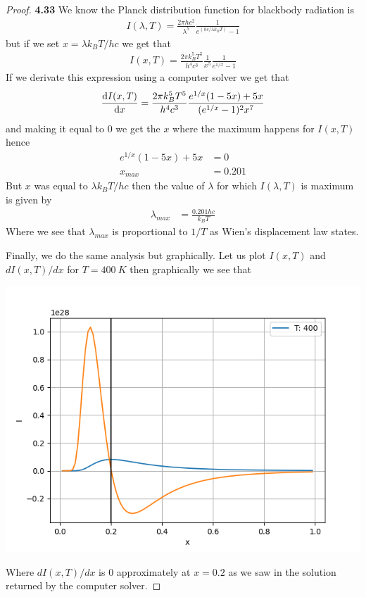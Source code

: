 \documentclass[11pt]{article}
\theoremstyle{definition}
\begin{document}
\begin{proof}{\textbf{4.33}}
    We know the Planck distribution function for blackbody radiation is
    \begin{align*}
        I(\lambda, T)
        = \frac{2\pi hc^2}{\lambda^5}\frac{1}{e^{(hc/\lambda k_B T)} -1}
    \end{align*}
    but if we set $x = \lambda k_B T / hc$ we get that
    \begin{align*}
        I(x, T)
        = \frac{2\pi k_B^5 T^5 }{h^4c^3}\frac{1}{x^5}\frac{1}{e^{1/x} -1}
    \end{align*}
    If we derivate this expression using a computer solver we get that
    \begin{align*}
        \derivative{I(x, T)}{x}
        = \frac{2\pi k_B^5 T^5 }{h^4c^3}
        \frac{e^{1/x}(1 - 5x) + 5x}{(e^{1/x}-1)^2x^7}
    \end{align*}
    and making it equal to 0 we get the $x$ where the maximum happens for
    $I(x,T)$ hence
    \begin{align*}
        e^{1/x}(1 - 5x) + 5x &= 0\\
        x_{max} &= 0.201
    \end{align*}
    But $x$ was equal to $\lambda k_B T/hc$ then the value of $\lambda$
    for which $I(\lambda,T)$ is maximum is given by
    \begin{align*}
        \lambda_{max} &= \frac{0.201 hc}{k_B T}
    \end{align*}
    Where we see that $\lambda_{max}$ is proportional to $1/T$ as Wien's 
    displacement law states.
    
    Finally, we do the same analysis but graphically. Let us plot
    $I(x, T)$ and $dI(x,T)/dx$ for $T = 400~K$ then graphically we see that
    \begin{center}
        \includegraphics*[scale=0.7]{ch4-33.png}
    \end{center}
    Where $dI(x,T)/dx$ is 0 approximately at $x = 0.2$ as we saw in the solution
    returned by the computer solver.
\end{proof}
\end{document}

